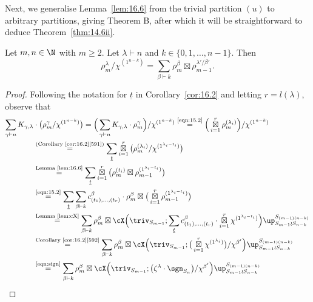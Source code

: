 Next, we generalise Lemma~\ref{lem:16.6} from the trivial partition $(u)$ to arbitrary partitions, giving Theorem B, after which it will be straightforward to deduce Theorem~\ref{thm:14.6ii}.

\begin{theorem}[Theorem B]\label{thm:16.7}
	Let $m,n\in\N$ with $m\ge 2$. Let $\lambda\vdash n$ and $k\in\{0,1,\dotsc,n-1\}$. Then
	\[ \rho^\lambda_m/\chi^{(1^{n-k})} = \sum_{\beta\vdash k} \rho^\beta_m\boxtimes \rho^{\lambda'/\beta'}_{m-1}. \]
\end{theorem}

\begin{proof}
	Following the notation for $\underline{t}$ in Corollary~\ref{cor:16.2} and letting $r=l(\lambda)$, observe that
	\begin{align*}
		\sum_{\gamma\vdash n} K_{\gamma,\lambda} &\cdot \big( \rho^\gamma_m/\chi^{(1^{n-k})} \big) = \Big( \sum_{\gamma\vdash n} K_{\gamma,\lambda}\cdot \rho^\gamma_m \Big)/\chi^{(1^{n-k})} \overset{\normalfont\tiny\text{\eqref{eqn:15.2}}}{=} \Big( \operatorname*{\boxtimes}_{i=1}^r \rho^{(\lambda_i)}_m\Big)/\chi^{(1^{n-k})}\\
		&\overset{\normalfont\tiny\text{(Corollary~\ref{cor:16.2}\ref{591})}}{=} \sum_{\underline{t}} \operatorname*{\boxtimes}_{i=1}^r \big( \rho^{(\lambda_i)}_m/\chi^{(1^{\lambda_i-t_i})} \big)\\
		&\overset{\normalfont\tiny\text{Lemma~\ref{lem:16.6}}}{=} \sum_{\underline{t}} \operatorname*{\boxtimes}_{i=1}^r \big( \rho^{(t_i)}_m \boxtimes \rho^{(1^{\lambda_i-t_i})}_{m-1} \big)\\
		&\overset{\normalfont\tiny\text{\eqref{eqn:15.2}}}{=} \sum_{\underline{t}} \sum_{\beta\vdash k} c^\beta_{(t_1),\dotsc,(t_r)}\cdot\rho^\beta_m \boxtimes \big(\operatorname*{\boxtimes}_{i=1}^r \rho^{(1^{\lambda_i-t_i})}_{m-1}\big)\\
		&\overset{\normalfont\tiny \text{Lemma~\ref{lem:cX}}}{=} \sum_{\beta\vdash k} \rho^\beta_m \boxtimes \cX\Big(\triv_{S_{m-1}}; \sum_{\underline{t}} c^\beta_{(t_1),\dotsc,(t_r)}\cdot \operatorname*{\boxtimes}_{i=1}^r \chi^{(1^{\lambda_i-t_i})} \Big)\up_{S_{m-1}\wr S_{n-k}}^{S_{(m-1)(n-k)}}\\
		&\overset{\normalfont\tiny\text{Corollary~\ref{cor:16.2}\ref{592}}}{=} \sum_{\beta\vdash k} \rho^\beta_m \boxtimes \cX \Big( \triv_{S_{m-1}}; \big( \operatorname*{\boxtimes}_{i=1}^r \chi^{(1^{\lambda_i})}\big) /\chi^{\beta'} \Big) \up_{S_{m-1}\wr S_{n-k}}^{S_{(m-1)(n-k)}}\\
		&\overset{\normalfont\tiny\text{\eqref{eqn:sign}}}{=} \sum_{\beta\vdash k} \rho^\beta_m \boxtimes \cX \Big( \triv_{S_{m-1}}; \big( \zeta^\lambda\cdot\sgn_{S_n} \big) /\chi^{\beta'} \Big) \up_{S_{m-1}\wr S_{n-k}}^{S_{(m-1)(n-k)}}\\

\end{align*}
\end{proof}
